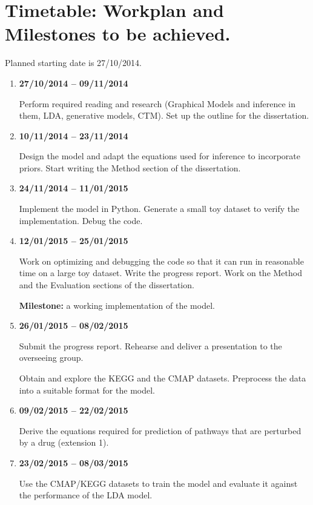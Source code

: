 \documentclass[12pt,a4]{article}
\begin{document}
\section*{Timetable: Workplan and Milestones to be achieved.}

Planned starting date is 27/10/2014.

\begin{enumerate}

\item {\bf 27/10/2014 -- 09/11/2014} 

Perform required reading and research (Graphical Models and inference in them, LDA, generative models, CTM). Set up the outline for the dissertation.

\item {\bf 10/11/2014 -- 23/11/2014} 

Design the model and adapt the equations used for inference to incorporate priors. Start writing the Method section of the dissertation.

\item {\bf 24/11/2014 -- 11/01/2015} 

Implement the model in Python. Generate a small toy dataset to verify the implementation. Debug the code.

\item {\bf 12/01/2015 -- 25/01/2015}

Work on optimizing and debugging the code so that it can run in reasonable time on a large toy dataset. Write the progress report. Work on the Method and the Evaluation sections of the dissertation.

\textbf{Milestone:} a working implementation of the model. 

\item {\bf 26/01/2015 -- 08/02/2015} 

Submit the progress report. Rehearse and deliver a presentation to the overseeing group.

Obtain and explore the KEGG and the CMAP datasets. Preprocess the data into a suitable format for the model.

\item {\bf 09/02/2015 -- 22/02/2015}

Derive the equations required for prediction of pathways that are perturbed by a drug (extension 1).

\item {\bf 23/02/2015 -- 08/03/2015}

Use the CMAP/KEGG datasets to train the model and evaluate it against the performance of the LDA model.


\end{enumerate}
\end{document}
